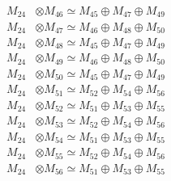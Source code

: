 \begin{align*}
M_{24} &\otimes M_{46} \simeq M_{45} \oplus M_{47} \oplus M_{49} \\
M_{24} &\otimes M_{47} \simeq M_{46} \oplus M_{48} \oplus M_{50} \\
M_{24} &\otimes M_{48} \simeq M_{45} \oplus M_{47} \oplus M_{49} \\
M_{24} &\otimes M_{49} \simeq M_{46} \oplus M_{48} \oplus M_{50} \\
M_{24} &\otimes M_{50} \simeq M_{45} \oplus M_{47} \oplus M_{49} \\
M_{24} &\otimes M_{51} \simeq M_{52} \oplus M_{54} \oplus M_{56} \\
M_{24} &\otimes M_{52} \simeq M_{51} \oplus M_{53} \oplus M_{55} \\
M_{24} &\otimes M_{53} \simeq M_{52} \oplus M_{54} \oplus M_{56} \\
M_{24} &\otimes M_{54} \simeq M_{51} \oplus M_{53} \oplus M_{55} \\
M_{24} &\otimes M_{55} \simeq M_{52} \oplus M_{54} \oplus M_{56} \\
M_{24} &\otimes M_{56} \simeq M_{51} \oplus M_{53} \oplus M_{55} \\
\end{align*}

